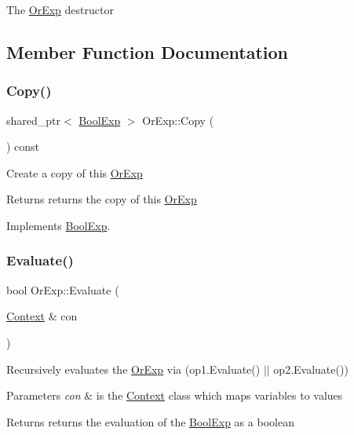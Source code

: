 The \mbox{\hyperlink{classOrExp}{Or\+Exp}} destructor 

\subsection{Member Function Documentation}
\mbox{\label{classOrExp_a142f557d9b95c4464dbd9167dbb9fe51}} 
\subsubsection{\texorpdfstring{Copy()}{Copy()}}
{\footnotesize\ttfamily shared\+\_\+ptr$<$ \mbox{\hyperlink{classBoolExp}{Bool\+Exp}} $>$ Or\+Exp\+::\+Copy (\begin{DoxyParamCaption}{ }\end{DoxyParamCaption}) const\hspace{0.3cm}{\ttfamily [virtual]}}

Create a copy of this \mbox{\hyperlink{classOrExp}{Or\+Exp}} \begin{DoxyReturn}{Returns}
returns the copy of this \mbox{\hyperlink{classOrExp}{Or\+Exp}} 
\end{DoxyReturn}


Implements \mbox{\hyperlink{classBoolExp_a846c30d1730cf645a040978a4cf7cdbb}{Bool\+Exp}}.

\mbox{\label{classOrExp_a2056a325b87621e2a3d0afff79c4163e}} 
\subsubsection{\texorpdfstring{Evaluate()}{Evaluate()}}
{\footnotesize\ttfamily bool Or\+Exp\+::\+Evaluate (\begin{DoxyParamCaption}\item[{\mbox{\hyperlink{classContext}{Context}} \&}]{con }\end{DoxyParamCaption})\hspace{0.3cm}{\ttfamily [virtual]}}

Recursively evaluates the \mbox{\hyperlink{classOrExp}{Or\+Exp}} via (op1.\+Evaluate() $\vert$$\vert$ op2.\+Evaluate()) 
\begin{DoxyParams}{Parameters}
{\em con} & is the \mbox{\hyperlink{classContext}{Context}} class which maps variables to values \\
\hline
\end{DoxyParams}
\begin{DoxyReturn}{Returns}
returns the evaluation of the \mbox{\hyperlink{classBoolExp}{Bool\+Exp}} as a boolean 
\end{DoxyReturn}


